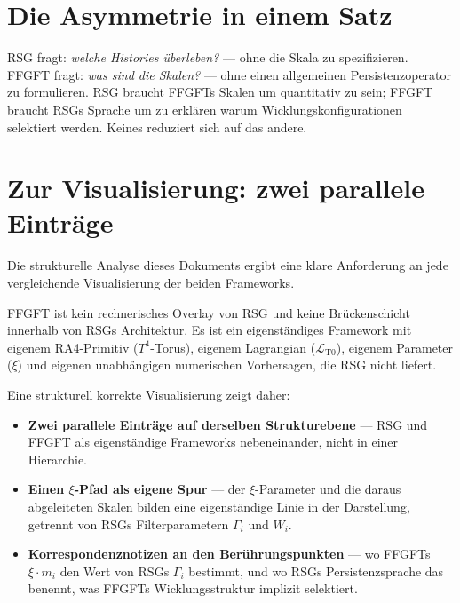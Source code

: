 \section{Die Asymmetrie in einem Satz}

\begin{keyresult}
RSG fragt: \emph{welche Histories überleben?} — ohne die Skala zu spezifizieren.
FFGFT fragt: \emph{was sind die Skalen?} — ohne einen allgemeinen
Persistenzoperator zu formulieren. RSG braucht FFGFTs Skalen um quantitativ
zu sein; FFGFT braucht RSGs Sprache um zu erklären warum Wicklungskonfigurationen
selektiert werden. Keines reduziert sich auf das andere.
\end{keyresult}

\section{Zur Visualisierung: zwei parallele Einträge}

Die strukturelle Analyse dieses Dokuments ergibt eine klare Anforderung
an jede vergleichende Visualisierung der beiden Frameworks.

FFGFT ist kein rechnerisches Overlay von RSG und keine Brückenschicht
innerhalb von RSGs Architektur. Es ist ein eigenständiges Framework mit
eigenem RA4-Primitiv ($T^4$-Torus), eigenem Lagrangian
($\mathcal{L}_{\text{T0}}$), eigenem Parameter ($\xi$) und eigenen
unabhängigen numerischen Vorhersagen, die RSG nicht liefert.

Eine strukturell korrekte Visualisierung zeigt daher:

\begin{itemize}
  \item \textbf{Zwei parallele Einträge auf derselben Strukturebene} —
        RSG und FFGFT als eigenständige Frameworks nebeneinander, nicht
        in einer Hierarchie.
  \item \textbf{Einen $\xi$-Pfad als eigene Spur} — der $\xi$-Parameter
        und die daraus abgeleiteten Skalen bilden eine eigenständige
        Linie in der Darstellung, getrennt von RSGs Filterparametern
        $\Gamma_i$ und $W_i$.
  \item \textbf{Korrespondenznotizen an den Berührungspunkten} — wo
        FFGFTs $\xi \cdot m_i$ den Wert von RSGs $\Gamma_i$ bestimmt,
        und wo RSGs Persistenzsprache das benennt, was FFGFTs
        Wicklungsstruktur implizit selektiert.
\end{itemize}

